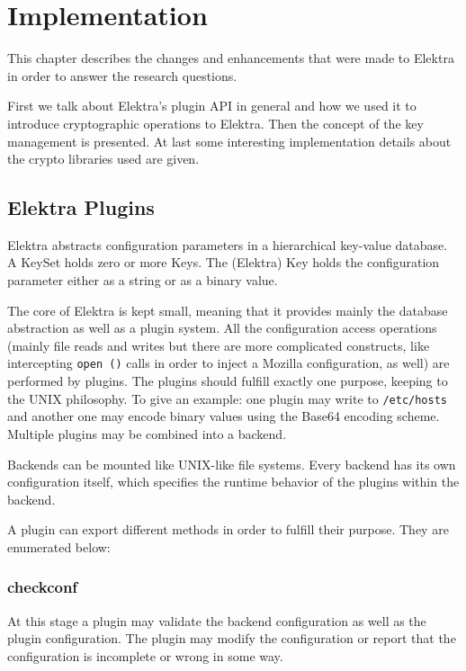\chapter{Implementation}

This chapter describes the changes and enhancements that were made to
Elektra in order to answer the research questions.

First we talk about Elektra's plugin API in general and how we used it
to introduce cryptographic operations to Elektra. Then the concept of
the key management is presented. At last some interesting implementation
details about the crypto libraries used are given.

\section{Elektra Plugins}\label{elektra-plugins}

Elektra abstracts configuration parameters in a hierarchical key-value
database. A KeySet holds zero or more Keys. The (Elektra) Key holds the
configuration parameter either as a string or as a binary value.

The core of Elektra is kept small, meaning that it provides mainly the
database abstraction as well as a plugin system. All the configuration
access operations (mainly file reads and writes but there are more
complicated constructs, like intercepting \texttt{open\ ()} calls in
order to inject a Mozilla configuration, as well) are performed by
plugins. The plugins should fulfill exactly one purpose, keeping to the
UNIX philosophy. To give an example: one plugin may write to
\texttt{/etc/hosts} and another one may encode binary values using the
Base64 encoding scheme. Multiple plugins may be combined into a backend.

Backends can be mounted like UNIX-like file systems. Every backend has
its own configuration itself, which specifies the runtime behavior of
the plugins within the backend.

A plugin can export different methods in order to fulfill their purpose.
They are enumerated below:

\subsection{checkconf}\label{checkconf}

At this stage a plugin may validate the backend configuration as well as
the plugin configuration. The plugin may modify the configuration or
report that the configuration is incomplete or wrong in some way.

